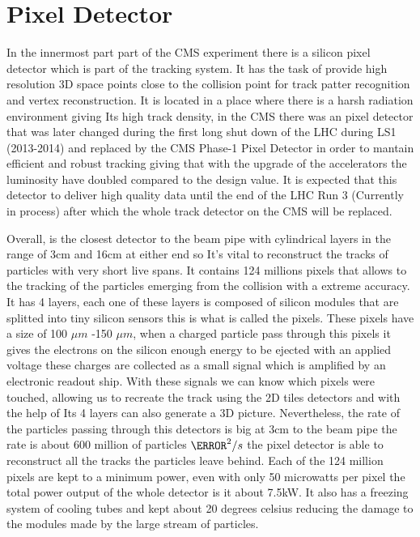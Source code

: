 \section{Pixel Detector}

In the innermost part part of the CMS experiment there is a silicon pixel detector which is part of the tracking system. It has the task of provide high resolution 3D space points close to the collision point for track patter recognition and vertex reconstruction. It is located in a place where there is a harsh radiation environment giving Its high track density, in the CMS there was an pixel detector that was later changed during the first long shut down of the LHC during LS1 (2013-2014) and replaced by the CMS Phase-1 Pixel Detector in order to mantain efficient and robust tracking giving that with the upgrade of the accelerators the luminosity have doubled compared to the design value. It is expected that this detector to deliver high quality data until the end of the LHC Run 3 (Currently in process) after which the whole track detector on the CMS will be replaced.
   
Overall, is the closest detector to the beam pipe with cylindrical layers in the range of 3cm and 16cm at either end so It's vital to reconstruct the tracks of particles with very short live spans. It contains 124 millions pixels that allows to the tracking of the particles emerging from the collision with a extreme accuracy. It has 4 layers, each one of these layers is composed of silicon modules that are splitted into tiny silicon sensors this is what is called the pixels. These pixels have a size of 100 $\mu m$ -150 $\mu m$, when a charged particle pass through this pixels it gives the electrons on the silicon enough energy to be ejected with an applied voltage these charges are collected as a small signal which is amplified by an electronic readout ship. With these signals we can know which pixels were touched, allowing  us to recreate the track using the 2D tiles detectors and with the help of Its 4 layers can also generate a 3D picture. Nevertheless, the rate of the particles passing through this detectors is big at 3cm to the beam pipe the rate is about 600 million of particles $\cm^{2} / s$ the pixel detector is able to reconstruct all the tracks the particles leave behind. Each of the 124 million pixels are kept to a minimum power, even with only 50 microwatts per pixel the total power output of the whole detector is it about 7.5kW. It also has a freezing system of cooling tubes and kept about 20 degrees celsius reducing the damage to the modules made by the large stream of particles. 

